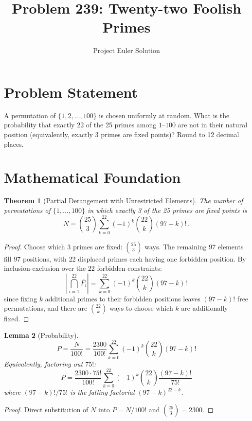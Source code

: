 \documentclass[12pt]{article}
\title{Problem 239: Twenty-two Foolish Primes}
\author{Project Euler Solution}
\date{}
\newtheorem{theorem}{Theorem}
\newtheorem{lemma}[theorem]{Lemma}
\begin{document}
\maketitle

\section{Problem Statement}
A permutation of $\{1, 2, \ldots, 100\}$ is chosen uniformly at random. What is the probability that exactly 22 of the 25 primes among $1$--$100$ are not in their natural position (equivalently, exactly 3 primes are fixed points)? Round to 12 decimal places.

\section{Mathematical Foundation}

\begin{theorem}[Partial Derangement with Unrestricted Elements]
The number of permutations of $\{1,\ldots,100\}$ in which exactly 3 of the 25 primes are fixed points is
\[
N = \binom{25}{3} \sum_{k=0}^{22} (-1)^k \binom{22}{k}(97-k)!\,.
\]
\end{theorem}

\begin{proof}
Choose which 3 primes are fixed: $\binom{25}{3}$ ways. The remaining 97 elements fill 97 positions, with 22 displaced primes each having one forbidden position. By inclusion-exclusion over the 22 forbidden constraints:
\[
\left|\bigcap_{i=1}^{22} \overline{F_i}\right| = \sum_{k=0}^{22} (-1)^k \binom{22}{k}(97-k)!
\]
since fixing $k$ additional primes to their forbidden positions leaves $(97-k)!$ free permutations, and there are $\binom{22}{k}$ ways to choose which $k$ are additionally fixed.
\end{proof}

\begin{lemma}[Probability]
\[
P = \frac{N}{100!} = \frac{2300}{100!} \sum_{k=0}^{22} (-1)^k \binom{22}{k}(97-k)!
\]
Equivalently, factoring out $75!$:
\[
P = \frac{2300 \cdot 75!}{100!} \sum_{k=0}^{22} (-1)^k \binom{22}{k} \frac{(97-k)!}{75!}
\]
where $(97-k)!/75!$ is the falling factorial $(97-k)^{\underline{22-k}}$.
\end{lemma}

\begin{proof}
Direct substitution of $N$ into $P = N/100!$ and $\binom{25}{3} = 2300$.
\end{proof}
\end{document}
